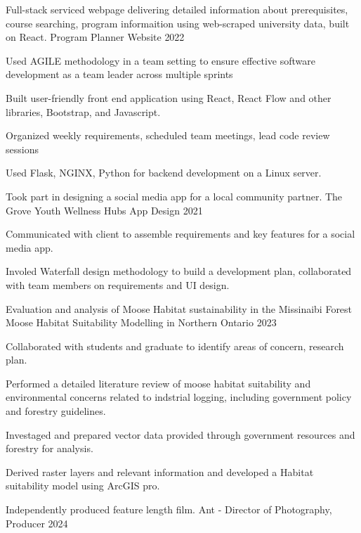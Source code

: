 \begin{cventries}
\cventry
{Full-stack serviced webpage delivering detailed information about prerequisites, course searching, program informaition using web-scraped university data, built on React.}
{Program Planner Website}
{}
{2022}
{
\begin{cvitems}
\item {Used AGILE methodology in a team setting to ensure effective software development as a team leader across multiple sprints}
\item {Built user-friendly front end application using React, React Flow and other libraries, Bootstrap, and Javascript.}
\item {Organized weekly requirements, scheduled team meetings, lead code review sessions}
\item {Used Flask, NGINX, Python for backend development on a Linux server.}
\end{cvitems}
}\cventry
{Took part in designing a social media app for a local community partner.}
{The Grove Youth Wellness Hubs App Design}
{}
{2021}
{
\begin{cvitems}
\item {Communicated with client to assemble requirements and key features for a social media app.}
\item {Involed Waterfall design methodology to build a development plan, collaborated with team members on requirements and UI design.}
\end{cvitems}
}\cventry
{Evaluation and analysis of Moose Habitat sustainability in the Missinaibi Forest}
{Moose Habitat Suitability Modelling in Northern Ontario}
{}
{2023}
{
\begin{cvitems}
\item {Collaborated with students and graduate to identify areas of concern, research plan.}
\item {Performed a detailed literature review of moose habitat suitability and environmental concerns related to indstrial logging, including government policy and forestry guidelines.}
\item {Investaged and prepared vector data provided through government resources and forestry for analysis.}
\item {Derived raster layers and relevant information and developed a Habitat suitability model using ArcGIS pro.}
\end{cvitems}
}\cventry
{Independently produced feature length film.}
{Ant - Director of Photography, Producer}
{}
{2024}
{
}
\end{cventries}
